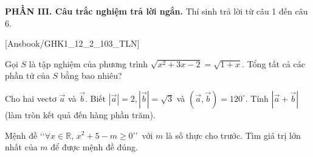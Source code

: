 \documentclass[12pt,a4paper,openany,oneside]{book}
\newcommand{\phanDe}[1]{\par\medskip\noindent #1\par\smallskip}
\begin{document}

\phanDe{\textbf{PHẦN III. Câu trắc nghiệm trả lời ngắn.} Thí sinh trả lời từ câu 1 đến câu 6.}

\setcounter{bt}{0}

[Ansbook/GHK1_12_2_103_TLN]

\begin{bt}%
	Gọi $S$ là tập nghiệm của phương trình $\sqrt{x^2+3x-2}=\sqrt{1+x}$.  Tổng tất cả các phần tử của $S$ bằng bao nhiêu?
\end{bt}

\begin{bt}%
	Cho hai vectơ $\overrightarrow{a}$ và $\overrightarrow{b}$. Biết $\left|\overrightarrow{a}\right|=2,\left|\overrightarrow{b}\right|=\sqrt{3}$ và $\left(\overrightarrow{a}, \overrightarrow{b}\right)=120^{\circ}$. Tính $\left|\overrightarrow{a}+\overrightarrow{b}\right|$ (làm tròn kết quả đến  hàng phần trăm).
\end{bt}

\begin{bt}%
	Mệnh đề \lq\lq$ \forall x\in\mathbb{R},\, x^2+5-m\ge 0 $\rq\rq~với $m$ là số thực cho trước. Tìm giá trị lớn nhất của $m$ để  được mệnh đề đúng.
\end{bt}
\end{document}

